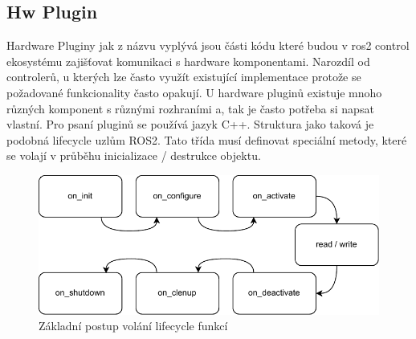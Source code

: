 \subsection{Hw Plugin}
Hardware Pluginy jak z názvu vyplývá jsou části kódu které budou v ros2 control ekosystému zajišťovat komunikaci s hardware komponentami. Narozdíl od controlerů, u kterých lze často využít existující implementace protože se požadované funkcionality často opakují. U hardware pluginů existuje mnoho různých komponent s různými rozhraními a, tak je často potřeba si napsat vlastní. Pro psaní pluginů se používá jazyk C++. Struktura jako taková je podobná lifecycle uzlům ROS2. Tato třída musí definovat speciální metody, které se volají v průběhu inicializace / destrukce objektu.

\begin{figure}[h!]
	\centering
	\includegraphics[scale=0.8]{obrazky-figures/ros2_control_wh_plugin_transitions.pdf}
	\caption{Základní postup volání lifecycle funkcí}
	\label{}
\end{figure}

